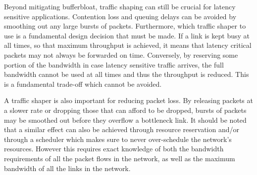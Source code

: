 Beyond mitigating bufferbloat, traffic shaping can still be crucial for latency sensitive applications. Contention loss and queuing delays can be avoided by smoothing out any large bursts of packets. Furthermore, which traffic shaper to use is a fundamental design decision that must be made. If a link is kept busy at all times, so that maximum throughput is achieved, it means that latency critical packets may not always be forwarded on time. Conversely, by reserving some portion of the bandwidth in case latency sensitive traffic arrives, the full bandwidth cannot be used at all times and thus the throughput is reduced. This is a fundamental trade-off which cannot be avoided.



A traffic shaper is also important for reducing packet loss. By releasing packets at a slower rate or dropping those that can afford to be dropped, bursts of packets may be smoothed out before they overflow a bottleneck link. It should be noted that a similar effect can also be achieved through resource reservation and/or through a scheduler which makes sure to never over-schedule the network's resources. However this requires exact knowledge of both the bandwidth requirements of all the packet flows in the network, as well as the maximum bandwidth of all the links in the network.


